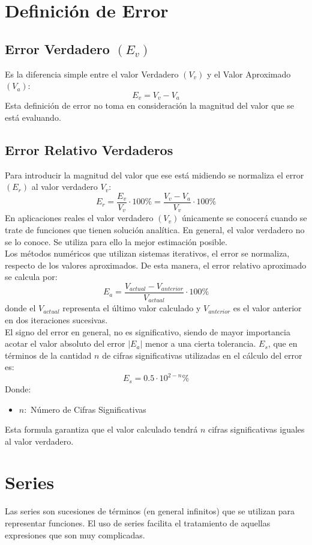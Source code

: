 \section{Definición de Error}
\subsection{Error Verdadero $(E_v)$}
Es la diferencia simple entre el valor Verdadero $(V_v)$ y el Valor Aproximado $(V_a)$:
$$E_v=V_v - V_a$$
Esta definición de error no toma en consideración la magnitud del valor que se está evaluando.
\subsection{Error Relativo Verdaderos}
Para introducir la magnitud del valor que ese está midiendo se normaliza el error $(E_r)$ al valor verdadero $V_v$:
$$E_r = \dfrac{E_v}{V_v}\cdot 100\% = \dfrac{V_v-V_a}{V_v}\cdot 100\% $$
En aplicaciones reales el valor verdadero $(V_v)$ únicamente se conocerá cuando se trate de funciones que tienen solución analítica. En general, el valor verdadero no se lo conoce. Se utiliza para ello la mejor estimación posible.
\\${ }$\\
Los métodos numéricos que utilizan sistemas iterativos, el error se normaliza, respecto de los valores aproximados. De esta manera, el error relativo aproximado se calcula por:
$$E_a = \dfrac{V_{actual}-V_{anterior}}{V_{actual}}\cdot 100\% $$
donde el $V_{actual}$ representa el último valor calculado y $V_{anterior}$ es el valor anterior en dos iteraciones sucesivas.
\\${ }$\\
El signo del error en general, no es significativo, siendo de mayor importancia acotar el valor absoluto del error $|E_a|$ menor a una cierta tolerancia. $E_s$, que en términos de la cantidad $n$ de cifras significativas utilizadas en el cálculo del error es:
$$E_s =0.5 \cdot 10^{2-n} \%$$
Donde:
\begin{itemize}
\item $n:$ Número de Cifras Significativas
\end{itemize}
Esta formula garantiza que el valor calculado tendrá $n$ cifras significativas iguales al valor verdadero.
\section{Series}
Las series son sucesiones de términos (en general infinitos) que se utilizan para representar funciones. El uso de series facilita el tratamiento de aquellas expresiones que son muy complicadas.
